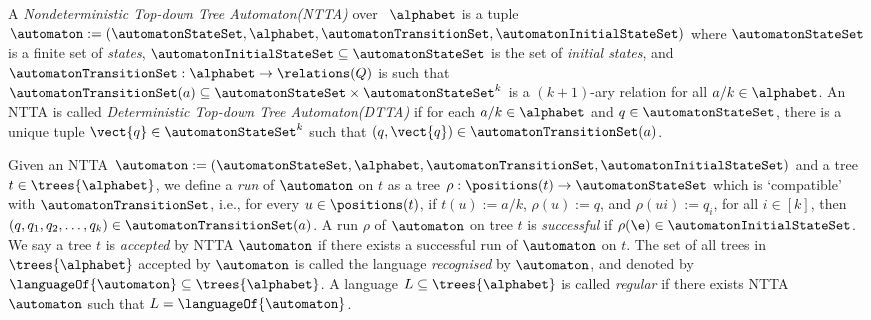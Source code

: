 
\begin{definition}\label{def:ntta}
    A \emph{Nondeterministic Top-down Tree Automaton(NTTA)} over \rab\ $\alphabet$ is a tuple $\automaton := (\automatonStateSet, \alphabet, \automatonTransitionSet, \automatonInitialStateSet)$ where $\automatonStateSet$ is a finite set of \emph{states}, $\automatonInitialStateSet \subseteq \automatonStateSet$ is the set of \emph{initial states}, and $\automatonTransitionSet : \alphabet \to \relations(Q)$ is such that $\automatonTransitionSet(a) \subseteq \automatonStateSet \times \automatonStateSet^k$ is a $(k+1)$-ary relation for all $a/k \in \alphabet$. An NTTA is called \emph{Deterministic Top-down Tree Automaton(DTTA)} if for each $a/k \in \alphabet$ and $q \in \automatonStateSet$, there is a unique tuple $\vect{q} \in \automatonStateSet^k$ such that $(q, \vect{q}) \in \automatonTransitionSet(a)$.
\end{definition}

\begin{definition}\label{def:runAcceptanceNtta}
    Given an NTTA $\automaton := (\automatonStateSet, \alphabet, \automatonTransitionSet, \automatonInitialStateSet)$ and a tree $t \in \trees{\alphabet}$, we define a \emph{run} of $\automaton$ on $t$ as a tree $\rho : \positions(t) \to \automatonStateSet$ which is `compatible' with $\automatonTransitionSet$, i.e., for every $u \in \positions(t)$, if $t(u) := a/k$, $\rho(u) := q$, and $\rho(ui) := q_i$, for all $i \in [k]$, then $(q, q_1, q_2, \dots, q_k) \in \automatonTransitionSet(a)$. A run $\rho$ of $\automaton$ on tree $t$ is \emph{successful} if $\rho(\e) \in \automatonInitialStateSet$. We say a tree $t$ is \emph{accepted} by NTTA $\automaton$ if there exists a successful run of $\automaton$ on $t$. The set of all trees in $\trees{\alphabet}$ accepted by $\automaton$ is called the language \emph{recognised} by $\automaton$, and denoted by $\languageOf{\automaton} \subseteq \trees{\alphabet}$. A language $L \subseteq \trees{\alphabet}$ is called \emph{regular} if there exists NTTA $\automaton$ such that $L = \languageOf{\automaton}$.
\end{definition}


